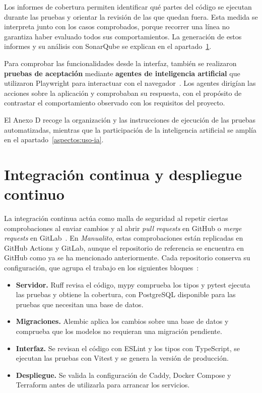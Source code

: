 Los informes de cobertura permiten identificar qué partes del código se
ejecutan durante las pruebas y orientar la revisión de las que quedan fuera.
Esta medida se interpreta junto con los casos comprobados, porque recorrer
una línea no garantiza haber evaluado todos sus comportamientos. La
generación de estos informes y su análisis con SonarQube se explican en el
apartado~\ref{aspectos:automatizacion}.

Para comprobar las funcionalidades desde la interfaz, también se realizaron
\textbf{pruebas de aceptación} mediante \textbf{agentes de inteligencia artificial} que
utilizaron Playwright para interactuar con el
navegador~\cite{playwright_library}. Los agentes dirigían las acciones sobre
la aplicación y comprobaban su respuesta, con el propósito de contrastar
el comportamiento observado con los requisitos del proyecto.

El Anexo D recoge la organización y las instrucciones de ejecución de las
pruebas automatizadas, mientras que la participación de la inteligencia
artificial se amplía en el apartado~\ref{aspectos:uso-ia}.

\section{Integración continua y despliegue continuo}
\label{aspectos:automatizacion}

La integración continua actúa como malla de seguridad al repetir ciertas
comprobaciones al enviar cambios y al abrir \textit{pull requests} en GitHub
o \textit{merge requests} en GitLab~\cite{github_ci,gitlab_ci}.
 En \textit{Manualito}, estas comprobaciones están replicadas en
GitHub Actions y GitLab, aunque el repositorio de referencia se encuentra
en GitHub como ya se ha mencionado anteriormente. Cada repositorio conserva su configuración, que
agrupa el trabajo en los siguientes bloques~\cite{manualito_workflows,
manualito_gitlab_ci}:

\begin{itemize}
    \item \textbf{Servidor.} Ruff revisa el código, mypy comprueba los tipos
    y pytest ejecuta las pruebas y obtiene la cobertura, con PostgreSQL
    disponible para las pruebas que necesitan una base de datos.
    \item \textbf{Migraciones.} Alembic aplica los cambios sobre una base
    de datos y comprueba que los modelos no requieran una migración pendiente.
    \item \textbf{Interfaz.} Se revisan el código con ESLint y los tipos
    con TypeScript, se ejecutan las pruebas con Vitest y se genera la
    versión de producción.
    \item \textbf{Despliegue.} Se valida la configuración de Caddy,
    Docker Compose y Terraform antes de utilizarla para arrancar los servicios.
\end{itemize}

